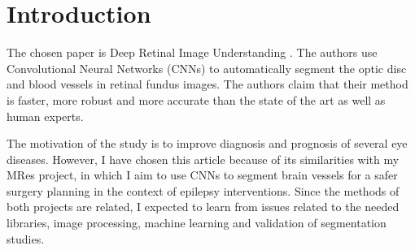 \section{Introduction}


The chosen paper is Deep Retinal Image Understanding \cite{maninis_deep_2016}. The authors use Convolutional Neural Networks (CNNs) to automatically segment the optic disc and blood vessels in retinal fundus images. The authors claim that their method is faster, more robust and more accurate than the state of the art as well as human experts.

The motivation of the study is to improve diagnosis and prognosis of several eye diseases. However, I have chosen this article because of its similarities with my MRes project, in which I aim to use CNNs to segment brain vessels for a safer surgery planning in the context of epilepsy interventions. Since the methods of both projects are related, I expected to learn from issues related to the needed libraries, image processing, machine learning and validation of segmentation studies.
